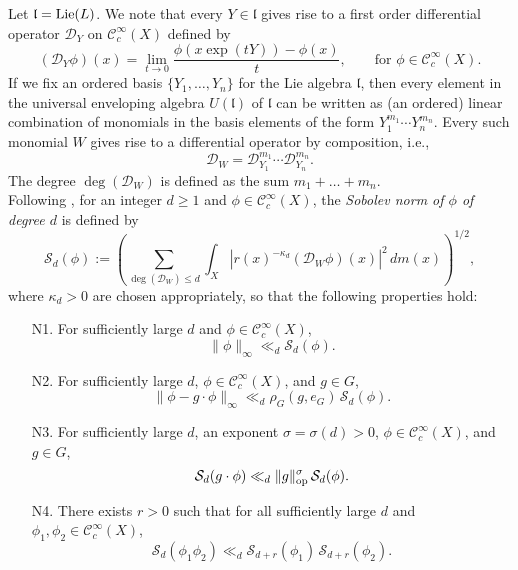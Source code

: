 \documentclass[11pt,reqno,a4paper]{amsart}
\numberwithin{equation}{section}
\newcommand{\cC}{\mathcal{C}}
\newcommand{\cD}{\mathcal{D}}
\newcommand{\cS}{\mathcal{S}}
\newcommand{\gol}{\mathfrak{l}}
\newcommand{\ra}{\rightarrow}
\theoremstyle{theorem}
\theoremstyle{definition}
\begin{document}
Let $\mathfrak{l}=\hbox{Lie}(L)$.
We note that every $Y \in \gol$ gives rise to a first order differential operator $\cD_Y$ on $\cC^\infty_c(X)$ defined by
\[
(\cD_Y \phi)(x) = \lim_{t \ra 0} \frac{\phi(x \exp(tY)) - \phi(x)}{t}, \quad\quad \textrm{for $\phi \in \cC^\infty_c(X)$}.
\]
If we fix an ordered basis $\{Y_1,\ldots,Y_n\}$ for the Lie algebra $\gol$, then every element in the universal enveloping algebra $U(\gol)$
of $\gol$ can be written as (an ordered) linear combination of monomials in the basis elements 
of the form $Y_1^{m_1} \cdots Y_n^{m_n}$. Every 
such monomial $W$ gives rise to a differential operator by composition, i.e.,
\begin{equation}\label{eq:DDD}
\cD_W = \cD_{Y_1}^{m_1} \cdots \cD_{Y_n}^{m_n}.
\end{equation}
The {degree} $\deg(\cD_W)$ is defined as the sum $m_1 + \ldots + m_n$. \\

Following \cite{EMV}, for an integer $d \geq 1$ and $\phi \in\cC_c^\infty(X)$, the 
\emph{Sobolev norm of $\phi$ of degree $d$} is defined by
\begin{equation}
\label{def_Sobolev}
\cS_d(\phi) := \left(\sum_{\deg(\cD_W) \leq d} \int_X |r(x)^{-\kappa_d} (\cD_W \phi)(x)|^2 \, dm(x)\right)^{1/2},
\end{equation}
where $\kappa_d > 0$ are chosen appropriately, so that the following properties hold:
\begin{enumerate}
 \setlength\itemsep{0.5em}
\item[N1.] For sufficiently large $d$ and $\phi \in\cC_c^\infty(X)$,
\begin{equation}
\label{unilip}
\|\phi\|_\infty \ll_d  \cS_d(\phi).
\end{equation}

\item[N2.] For sufficiently large $d$, $\phi \in\cC_c^\infty(X)$, and $g\in G$,
\begin{equation}
\label{unilip00}
\|\phi - g \cdot \phi\|_\infty \ll_d \rho_G(g,e_G) \, \cS_d(\phi).
\end{equation}

\item[N3.] For sufficiently large $d$, an exponent $\sigma=\sigma(d) > 0$, $\phi \in\cC_c^\infty(X)$, and $g\in G$,
\begin{equation}
\label{gbnd}
\cS_d(g \cdot \phi) \ll_d \|g\|_{\rm op}^{\sigma} \, \cS_d(\phi).
\end{equation}

\item[N4.] There exists $r > 0$ such that for all sufficiently large $d$
and $\phi_1, \phi_2 \in\cC_c^\infty(X)$,
\begin{equation}
\label{dr}
\cS_d(\phi_1 \phi_2) \ll_{d} \cS_{d+r}(\phi_1) \, \cS_{d+r}(\phi_2).
\end{equation}
\end{enumerate}
\end{document}
